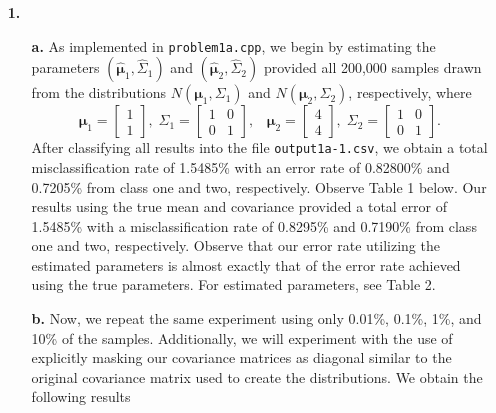\documentclass[ 12pt ]{article}
\begin{document}
\begin{enumerate}
    \item[\textbf{1.}] $ $
        \begin{enumerate}
                \item[\textbf{a.}] As implemented in \verb|problem1a.cpp|, we begin by estimating the parameters $(\hat{\boldsymbol{\mu}}_1, \hat{\Sigma}_1)$ and $(\hat{\boldsymbol{\mu}}_2, \hat{\Sigma}_2)$ provided all 200,000 samples drawn from the distributions $N(\boldsymbol{\mu}_1, \Sigma_1)$ and $N(\boldsymbol{\mu}_2, \Sigma_2)$, respectively, where $$\boldsymbol{\mu}_1 = \begin{bmatrix} 1 \\ 1
\end{bmatrix},\; \Sigma_1 = \begin{bmatrix} 1 & 0 \\ 0 & 1 \end{bmatrix},\;\;\; \boldsymbol{\mu}_2 = \begin{bmatrix} 4 \\ 4 \end{bmatrix},\; \Sigma_2 = \begin{bmatrix} 1 & 0 \\ 0 & 1 \end{bmatrix}.$$ After classifying all results into the file \verb|output1a-1.csv|, we obtain a total misclassification rate of 1.5485\% with an error rate of 0.82800\% and 0.7205\% from class one and two, respectively. Observe Table 1 below. Our results using the true mean and covariance provided a total error of 1.5485\% with a misclassification rate of 0.8295\% and 0.7190\% from class one and two, respectively. Observe that our error rate utilizing the estimated parameters is almost exactly that of the error rate achieved using the true parameters. For estimated parameters, see Table 2.

                \item[\textbf{b.}] Now, we repeat the same experiment using only 0.01\%, 0.1\%, 1\%, and 10\% of the samples. Additionally, we will experiment with the use of explicitly masking our covariance matrices as diagonal similar to the original covariance matrix used to create the distributions. We obtain the following results
\begin{center}
                

\end{center}
\end{enumerate}
\end{enumerate}
\end{document}
